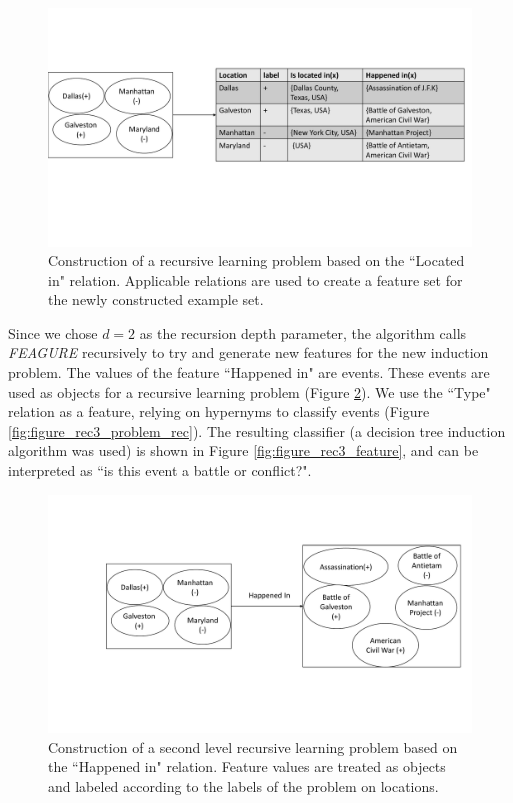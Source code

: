 \documentclass[letterpaper]{article} %
\theoremstyle{definition}
\begin{document}
\begin{figure}[!h]
	\centering
	\includegraphics[width=\linewidth]{figure_rec3_problem_new}
	\caption{Construction of a recursive learning problem based on the ``Located in" relation. Applicable relations are used to create a feature set for the newly constructed example set.}
	\label{fig:figure_rec3_problem}
\end{figure}

Since we chose $d=2$ as the recursion depth parameter, the algorithm calls \emph{FEAGURE} recursively to try and generate new features for the new induction problem.
The values of the feature ``Happened in" are events. These events are used as objects for a recursive learning problem (Figure \ref{fig:figure_rec3_example_rec}).
We use the ``Type" relation as a feature, relying on hypernyms to classify events (Figure \ref{fig:figure_rec3_problem_rec}).
The resulting classifier (a decision tree induction algorithm was used) is shown in Figure \ref{fig:figure_rec3_feature}, and can be interpreted as ``is this event a battle or conflict?".

\begin{figure}[!h]
	\centering
	\includegraphics[width=0.9\linewidth]{figure_rec3_example_rec_new}
	\caption{Construction of a second level recursive learning problem based on the ``Happened in" relation. Feature values are treated as objects and labeled according to the labels of the problem on locations.}
	\label{fig:figure_rec3_example_rec}
\end{figure}
\end{document}

